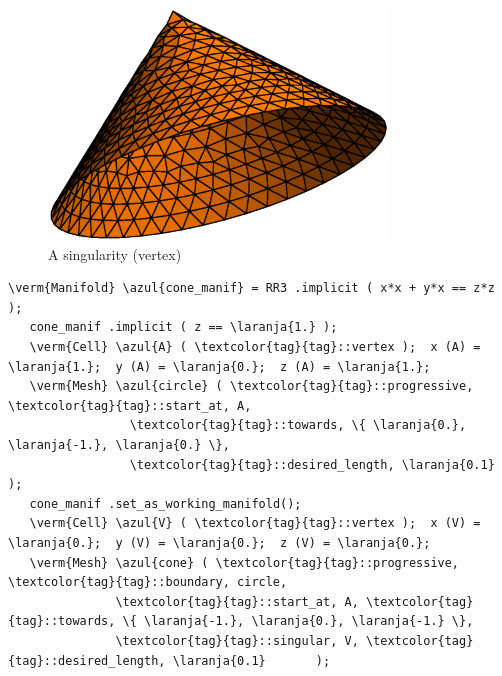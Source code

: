 \begin{figure}[ht] \centering
 \includegraphics[width=90mm]{cone}
  \caption{A singularity (vertex)}
  \label{\numb section 3.\numb fig 8}
\end{figure}

\begin{Verbatim}[commandchars=\\\{\},formatcom=\small\tt,frame=single,
   label=code not working,rulecolor=\color{coment},
   baselinestretch=0.94,framesep=2mm                                  ]
   \verm{Manifold} \azul{cone_manif} = RR3 .implicit ( x*x + y*x == z*z );
   cone_manif .implicit ( z == \laranja{1.} );
   \verm{Cell} \azul{A} ( \textcolor{tag}{tag}::vertex );  x (A) = \laranja{1.};  y (A) = \laranja{0.};  z (A) = \laranja{1.};
   \verm{Mesh} \azul{circle} ( \textcolor{tag}{tag}::progressive, \textcolor{tag}{tag}::start_at, A,
                 \textcolor{tag}{tag}::towards, \{ \laranja{0.}, \laranja{-1.}, \laranja{0.} \},
                 \textcolor{tag}{tag}::desired_length, \laranja{0.1}           );
   cone_manif .set_as_working_manifold();
   \verm{Cell} \azul{V} ( \textcolor{tag}{tag}::vertex );  x (V) = \laranja{0.};  y (V) = \laranja{0.};  z (V) = \laranja{0.};
   \verm{Mesh} \azul{cone} ( \textcolor{tag}{tag}::progressive, \textcolor{tag}{tag}::boundary, circle,
               \textcolor{tag}{tag}::start_at, A, \textcolor{tag}{tag}::towards, \{ \laranja{-1.}, \laranja{0.}, \laranja{-1.} \},
               \textcolor{tag}{tag}::singular, V, \textcolor{tag}{tag}::desired_length, \laranja{0.1}       );
\end{Verbatim}


\section{~~}\label{\numb section 3.\numb parag 21}

